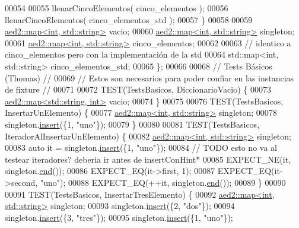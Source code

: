 \begin{DoxyCode}
00054 
00055         llenarCincoElementos( cinco\_elementos );
00056         llenarCincoElementos( cinco\_elementos\_std );
00057     \}
00058 
00059     \hyperlink{classaed2_1_1map}{aed2::map<int, std::string>} vacio;
00060     \hyperlink{classaed2_1_1map}{aed2::map<int, std::string>} singleton;
00061     \hyperlink{classaed2_1_1map}{aed2::map<int, std::string>} cinco\_elementos;
00062 
00063     \textcolor{comment}{// identico a cinco\_elementos pero con la implementación de la std}
00064     std::map<int, std::string> cinco\_elementos\_std;
00065 \};
00066 
00068 \textcolor{comment}{// Tests Básicos (Thomas)                                               //}
00069 \textcolor{comment}{// Estos son necesarios para poder confiar en las instancias de fixture //}
00071 \textcolor{comment}{}
00072 TEST(TestsBasicos, DiccionarioVacio) \{
00073     \hyperlink{classaed2_1_1map}{aed2::map<std::string, int>} vacio;
00074 \}
00075 
00076 TEST(TestsBasicos, InsertarUnElemento) \{
00077     \hyperlink{classaed2_1_1map}{aed2::map<int, std::string>} singleton;
00078     singleton.\hyperlink{classaed2_1_1map_a6941cde9a79c27f054b5c97a587a1854_a6941cde9a79c27f054b5c97a587a1854}{insert}(\{1, \textcolor{stringliteral}{"uno"}\});
00079 \}
00080 
00081 TEST(TestsBasicos, IteradorAlInsertarUnElemento) \{
00082     \hyperlink{classaed2_1_1map}{aed2::map<int, std::string>} singleton;
00083     \textcolor{keyword}{auto} it = singleton.\hyperlink{classaed2_1_1map_a6941cde9a79c27f054b5c97a587a1854_a6941cde9a79c27f054b5c97a587a1854}{insert}(\{1, \textcolor{stringliteral}{"uno"}\});
00084     \textcolor{comment}{// TODO esto no va al testear iteradores? deberia ir antes de insertConHint*}
00085     EXPECT\_NE(it, singleton.\hyperlink{classaed2_1_1map_a76023e6a56cb625513e1b5ea028bf983_a76023e6a56cb625513e1b5ea028bf983}{end}());
00086     EXPECT\_EQ(it->first, 1);
00087     EXPECT\_EQ(it->second, \textcolor{stringliteral}{"uno"});
00088     EXPECT\_EQ(++it, singleton.\hyperlink{classaed2_1_1map_a76023e6a56cb625513e1b5ea028bf983_a76023e6a56cb625513e1b5ea028bf983}{end}());
00089 \}
00090 
00091 TEST(TestsBasicos, InsertarTresElemento) \{
00092     \hyperlink{classaed2_1_1map}{aed2::map<int, std::string>} singleton;
00093     singleton.\hyperlink{classaed2_1_1map_a6941cde9a79c27f054b5c97a587a1854_a6941cde9a79c27f054b5c97a587a1854}{insert}(\{2, \textcolor{stringliteral}{"dos"}\});
00094     singleton.\hyperlink{classaed2_1_1map_a6941cde9a79c27f054b5c97a587a1854_a6941cde9a79c27f054b5c97a587a1854}{insert}(\{3, \textcolor{stringliteral}{"tres"}\});
00095     singleton.\hyperlink{classaed2_1_1map_a6941cde9a79c27f054b5c97a587a1854_a6941cde9a79c27f054b5c97a587a1854}{insert}(\{1, \textcolor{stringliteral}{"uno"}\});

\end{DoxyCode}
